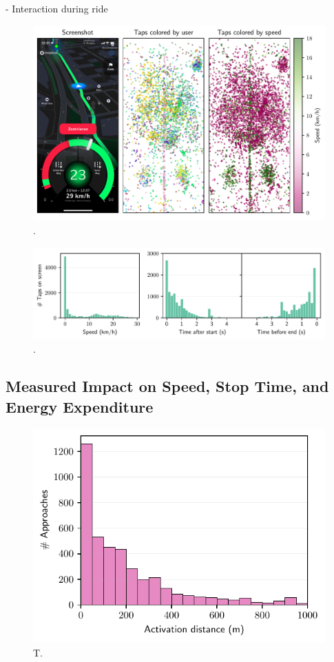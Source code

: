 - Interaction during ride

\begin{figure}[t]
\caption{.}\label{fig:}
\includegraphics[width=\linewidth]{images/app-user-interaction.pdf}
\end{figure}

\begin{figure}[t]
\caption{.}\label{fig:}
\includegraphics[width=\linewidth]{images/app-user-interaction-speed.pdf}
\end{figure}


\subsection{Measured Impact on Speed, Stop Time, and Energy Expenditure}

\begin{figure}[t]
\caption{T.}\label{fig:}
\includegraphics[width=0.6\linewidth]{images/impacts-activation-distances.pdf}
\end{figure}

